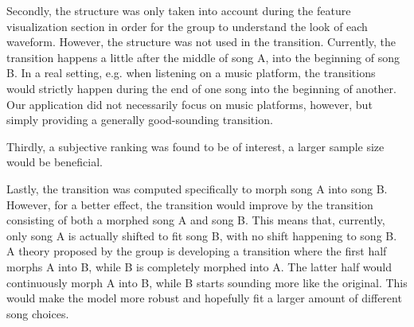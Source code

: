 \documentclass[14pt]{extarticle}
\begin{document}
Secondly, the structure was only taken into account during the feature visualization section in order for the group to understand the look of each waveform. However, the structure was not used in the transition. Currently, the transition happens a little after the middle of song A, into the beginning of song B. In a real setting, e.g. when listening on a music platform, the transitions would strictly happen during the end of one song into the beginning of another. Our application did not necessarily focus on music platforms, however, but simply providing a generally good-sounding transition.

Thirdly, a subjective ranking was found to be of interest, a larger sample size would be beneficial.

Lastly, the transition was computed specifically to morph song A into song B. However, for a better effect, the transition would improve by the transition consisting of both a morphed song A and song B. This means that, currently, only song A is actually shifted to fit song B, with no shift happening to song B. A theory proposed by the group is developing a transition where the first half morphs A into B, while B is completely morphed into A. The latter half would continuously morph A into B, while B starts sounding more like the original. This would make the model more robust and hopefully fit a larger amount of different song choices.









\end{document}
